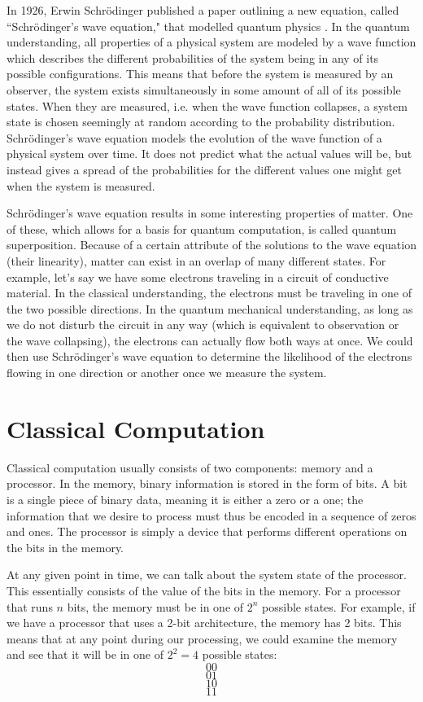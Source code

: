 \documentclass[11pt]{report}
\newcommand{\?}{\stackrel{?}{=}}
\begin{document}
In 1926, Erwin Schrödinger published a paper outlining a new equation, called ``Schrödinger’s wave equation," that modelled quantum physics \cite{schr26}. In the quantum understanding, all properties of a physical system are modeled by a wave function which describes the different probabilities of the system being in any of its possible configurations. This means that before the system is measured by an observer, the system exists simultaneously in some amount of all of its possible states. When they are measured, i.e. when the wave function collapses, a system state is chosen seemingly at random according to the probability distribution. Schrödinger's wave equation models the evolution of the wave function of a physical system over time. It does not predict what the actual values will be, but instead gives a spread of the probabilities for the different values one might get when the system is measured.

Schrödinger's wave equation results in some interesting properties of matter. One of these, which allows for a basis for quantum computation, is called quantum superposition. Because of a certain attribute of the solutions to the wave equation (their linearity), matter can exist in an overlap of many different states. For example, let's say we have some electrons traveling in a circuit of conductive material. In the classical understanding, the electrons must be traveling in one of the two possible directions. In the quantum mechanical understanding, as long as we do not disturb the circuit in any way (which is equivalent to observation or the wave collapsing), the electrons can actually flow both ways at once. We could then use Schrödinger's wave equation to determine the likelihood of the electrons flowing in one direction or another once we measure the system.

\section{Classical Computation}
Classical computation usually consists of two components: memory and a processor. In the memory, binary information is stored in the form of bits. A bit is a single piece of binary data, meaning it is either a zero or a one; the information that we desire to process must thus be encoded in a sequence of zeros and ones. The processor is simply a device that performs different operations on the bits in the memory.

At any given point in time, we can talk about the system state of the processor. This essentially consists of the value of the bits in the memory. For a processor that runs $n$ bits, the memory must be in one of $2^n$ possible states. For example, if we have a processor that uses a 2-bit architecture, the memory has 2 bits. This means that at any point during our processing, we could examine the memory and see that it will be in one of $2^2=4$ possible states:
$$00$$
$$01$$
$$10$$
$$11$$
\end{document}
